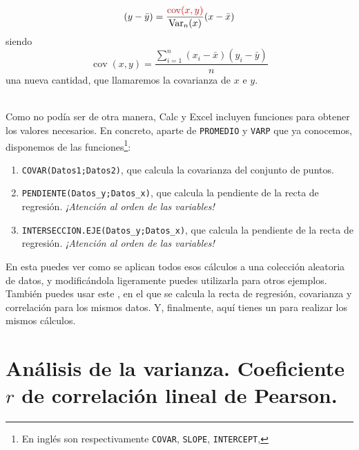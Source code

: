 \begin{itemize}
{{\begin{minipage}{14cm}
    \[(y-\bar y)=\dfrac{\textcolor{red}{\operatorname{cov}(x,y)}}{{\operatorname{Var}_n}(x)}(x-\bar x)\]
    siendo
    \[\operatorname{cov}(x,y)=\dfrac{\displaystyle\sum_{i=1}^{n}(x_i-\bar x)(y_i-\bar y)}{n}\]
    una nueva cantidad, que llamaremos la {\sf covarianza} de $x$ e $y$.
    \end{minipage}}}\\[3mm]
    Como no podía ser de otra manera, Calc y Excel incluyen funciones para obtener los valores necesarios. En concreto, aparte de {\tt PROMEDIO} y {\tt VARP} que ya conocemos, disponemos de las funciones\footnote{En inglés son respectivamente {\tt COVAR}, {\tt SLOPE}, {\tt INTERCEPT},}:
    \begin{enumerate}
    \item {\tt COVAR(Datos1;Datos2)}, que calcula la covarianza del conjunto de puntos.
    \item {\tt PENDIENTE(Datos\_y;Datos\_x)}, que calcula la pendiente de la recta de regresión. {\em ¡Atención al orden de las variables!}
    \item {\tt INTERSECCION.EJE(Datos\_y;Datos\_x)}, que calcula la pendiente de la recta de regresión. {\em ¡Atención al orden de las variables!}
    \end{enumerate}
    En esta  puedes ver como se aplican todos esos cálculos a una colección aleatoria de datos, y modificándola ligeramente puedes utilizarla para otros ejemplos. También puedes usar este , en el que se calcula la recta de regresión, covarianza y correlación para los mismos datos. Y, finalmente, aquí tienes un 
     para realizar los mismos cálculos.





\end{itemize}


\section{Análisis de la varianza. Coeficiente $r$ de correlación lineal de Pearson.}\label{sec:Anova}

